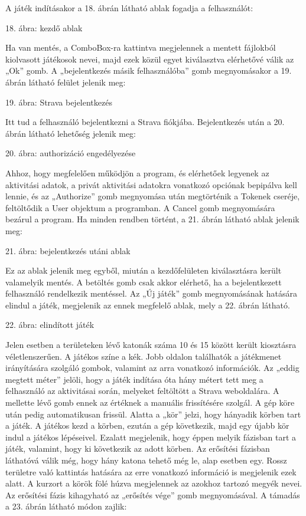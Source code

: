 A játék indításakor a 18. ábrán látható ablak fogadja a felhasználót: 

 

18. ábra: kezdő ablak 

Ha van mentés, a ComboBox-ra kattintva megjelennek a mentett fájlokból kiolvasott játékosok nevei, majd ezek közül egyet kiválasztva elérhetővé válik az „Ok” gomb. A „bejelentkezés másik felhasználóba” gomb megnyomásakor a 19. ábrán látható felület jelenik meg: 

 

19. ábra: Strava bejelentkezés 

Itt tud a felhasználó bejelentkezni a Strava fiókjába. Bejelentkezés után a 20. ábrán látható lehetőség jelenik meg: 

 

20. ábra: authorizáció engedélyezése 

Ahhoz, hogy megfelelően működjön a program, és elérhetőek legyenek az aktivitási adatok, a privát aktivitási adatokra vonatkozó opciónak bepipálva kell lennie, és az „Authorize” gomb megnyomása után megtörténik a Tokenek cseréje, feltöltődik a User objektum a programban. A Cancel gomb megnyomására bezárul a program. Ha minden rendben történt, a 21. ábrán látható ablak jelenik meg: 

 

21. ábra: bejelentkezés utáni ablak 

Ez az ablak jelenik meg egyből, miután a kezdőfelületen kiválasztásra került valamelyik mentés. A betöltés gomb csak akkor elérhető, ha a bejelentkezett felhasználó rendelkezik mentéssel. Az „Új játék” gomb megnyomásának hatására elindul a játék, megjelenik az ennek megfelelő ablak, mely a 22. ábrán látható. 

 

22. ábra: elindított játék 

Jelen esetben a területeken lévő katonák száma 10 és 15 között került kiosztásra véletlenszerűen. A játékos színe a kék. Jobb oldalon találhatók a játékmenet irányítására szolgáló gombok, valamint az arra vonatkozó információk. Az „eddig megtett méter” jelöli, hogy a játék indítása óta hány métert tett meg a felhasználó az aktivitásai során, melyeket feltöltött a Strava weboldalára. A mellette lévő gomb ennek az értéknek a manuális frissítésére szolgál. A gép köre után pedig automatikusan frissül. Alatta a „kör” jelzi, hogy hányadik körben tart a játék. A játékos kezd a körben, ezután a gép következik, majd egy újabb kör indul a játékos lépéseivel. Ezalatt megjelenik, hogy éppen melyik fázisban tart a játék, valamint, hogy ki következik az adott körben. Az erősítési fázisban láthatóvá válik még, hogy hány katona tehető még le, alap esetben egy. Rossz területre való kattintás hatására az erre vonatkozó információ is megjelenik ezek alatt. A kurzort a körök fölé húzva megjelennek az azokhoz tartozó megyék nevei. Az erősítési fázis kihagyható az „erősítés vége” gomb megnyomásával. A támadás a 23. ábrán látható módon zajlik: 

